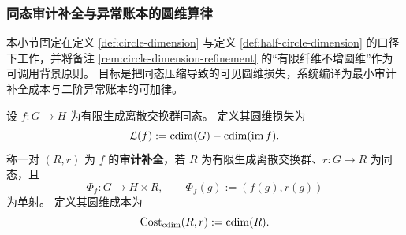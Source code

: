 \subsubsection{同态审计补全与异常账本的圆维算律}\label{subsubsec:cdim-hom-completion-anomaly-ledger}
本小节固定在定义 \ref{def:circle-dimension} 与定义 \ref{def:half-circle-dimension} 的口径下工作，并将备注 \ref{rem:circle-dimension-refinement} 的“有限纤维不增圆维”作为可调用背景原则。
目标是把同态压缩导致的可见圆维损失，系统编译为最小审计补全成本与二阶异常账本的可加律。

\begin{definition}[圆维损失与审计补全]\label{def:cdim-audit-completion-loss}
设 \(f:G\to H\) 为有限生成离散交换群同态。
定义其圆维损失为
\[
\mathcal L(f):=\operatorname{cdim}(G)-\operatorname{cdim}(\operatorname{im}f).
\]
称一对 \((R,r)\) 为 \(f\) 的\textbf{审计补全}，若 \(R\) 为有限生成离散交换群、\(r:G\to R\) 为同态，且
\[
\Phi_f:G\longrightarrow H\times R,\qquad \Phi_f(g):=(f(g),r(g))
\]
为单射。
定义其圆维成本为
\[
\operatorname{Cost}_{\operatorname{cdim}}(R,r):=\operatorname{cdim}(R).
\]
\end{definition}

